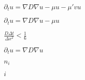 \documentclass{article}
\begin{document}
$ \partial_t u = \nabla D \nabla u - \mu u - \mu' v u $
\pagebreak

$ \partial_t u = \nabla D \nabla u - \mu u $
\pagebreak

$ \frac{D \Delta t}{\Delta x^2} < \frac{1}{6} $
\pagebreak

$ \partial_t u = \nabla D \nabla u $
\pagebreak

$n_i$
\pagebreak

$i$
\pagebreak
\end{document}
